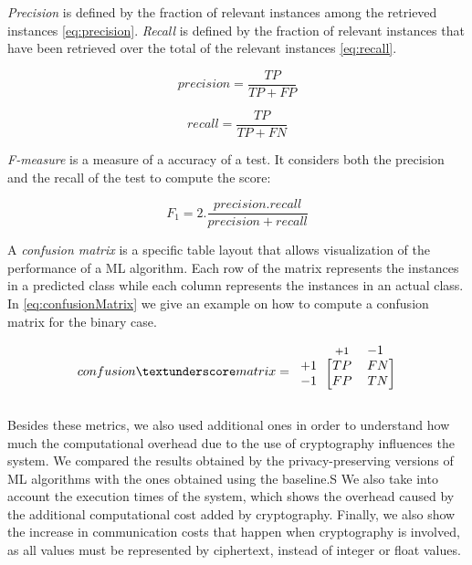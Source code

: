 \textit{Precision} is defined by the fraction of relevant instances among the retrieved instances \ref{eq:precision}. \textit{Recall} is defined by the fraction of relevant instances that have been retrieved over the total of the relevant instances \ref{eq:recall}.


\begin{equation}
\label{eq:precision}
precision=\frac{TP}{TP + FP}
\end{equation}

\begin{equation}
\label{eq:recall}
recall=\frac{TP}{TP + FN}
\end{equation}

\textit{F-measure} is a measure of a accuracy of a test. It considers both the precision and the recall of the test to compute the score:

\begin{equation}
\label{eq:f-measure}
F_1=2. \frac{precision.recall}{precision + recall}
\end{equation}


A \textit{confusion matrix} is a specific table layout that allows visualization of the performance of a \ac{ML} algorithm. Each row of the matrix represents the instances in a predicted class while each column represents the instances in an actual class. In \ref{eq:confusionMatrix} we give an example on how to compute a confusion matrix for the binary case.

\begin{equation*}
\label{eq:confusionMatrix}
  confusion\textunderscore matrix=
  \begin{blockarray}{*{2}{c} l}
    \begin{block}{*{2}{>{$\footnotesize}c<{$}} l}
      &+1 & -1  \\
    \end{block}
    \begin{block}{c [*{2}{c}]}
      +1 & TP & FN  \\
      -1 & FP & TN \\
    \end{block}
  \end{blockarray}
\end{equation*}


Besides these metrics, we also used additional ones in order to understand how much the computational overhead due to the use of cryptography influences the system.
We compared the results obtained by the privacy-preserving versions of \ac{ML} algorithms with the ones obtained using the baseline.S
We also take into account the execution times of the system, which shows the overhead caused by the additional computational cost added by cryptography.
Finally, we also show the increase in communication costs that happen when cryptography is involved, as all values must be represented by ciphertext, instead of integer or float values.


